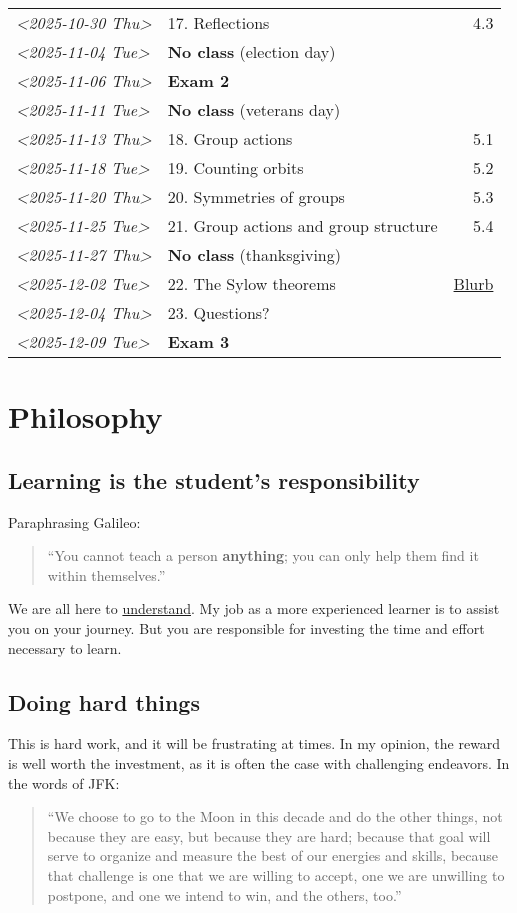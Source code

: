\documentclass[11pt]{article}
\begin{document}
\begin{center}
\begin{tabular}{l|l|r}
\textit{<2025-10-30 Thu>} & 17. Reflections & 4.3\\[0pt]
\textit{<2025-11-04 Tue>} & \textbf{No class} (election day) & \\[0pt]
\textit{<2025-11-06 Thu>} & \textbf{Exam 2} & \\[0pt]
\textit{<2025-11-11 Tue>} & \textbf{No class} (veterans day) & \\[0pt]
\textit{<2025-11-13 Thu>} & 18. Group actions & 5.1\\[0pt]
\textit{<2025-11-18 Tue>} & 19. Counting orbits & 5.2\\[0pt]
\textit{<2025-11-20 Thu>} & 20. Symmetries of groups & 5.3\\[0pt]
\textit{<2025-11-25 Tue>} & 21. Group actions and group structure & 5.4\\[0pt]
\textit{<2025-11-27 Thu>} & \textbf{No class} (thanksgiving) & \\[0pt]
\textit{<2025-12-02 Tue>} & 22. The Sylow theorems & \href{https://kconrad.math.uconn.edu/blurbs/grouptheory/sylowpf.pdf}{Blurb}\\[0pt]
\textit{<2025-12-04 Thu>} & 23. Questions? & \\[0pt]
\textit{<2025-12-09 Tue>} & \textbf{Exam 3} & \\[0pt]
\hline
\end{tabular}
\end{center}

\section{Philosophy}
\label{sec:org40fc5f1}
\subsection{Learning is the student's responsibility}
\label{sec:org106b85a}
Paraphrasing Galileo:
\begin{quote}
``You cannot teach a person \textbf{anything}; you can only help
them find it within themselves.''
\end{quote}
We are all here to \uline{understand}. My job as a more experienced learner is to
assist you on your journey. But you are responsible for investing the time and
effort necessary to learn.
\subsection{Doing hard things}
\label{sec:org6386c11}
This is hard work, and it will be frustrating at times. In my opinion, the
reward is well worth the investment, as it is often the case with challenging
endeavors. In the words of JFK:
\begin{quote}
``We choose to go to the Moon in this decade and do the other things, not
because they are easy, but because they are hard; because that goal will serve
to organize and measure the best of our energies and skills, because that
challenge is one that we are willing to accept, one we are unwilling to
postpone, and one we intend to win, and the others, too.''
\end{quote}
\end{document}
